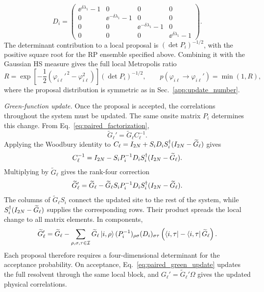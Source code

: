 \begin{equation}
    D_i=
    \begin{pmatrix}
        \ee^{\delta\lambda_1}-1&0&0&0\\
        0&\ee^{-\delta\lambda_1}-1&0&0\\
        0&0&\ee^{-\delta\lambda_1}-1&0\\
        0&0&0&\ee^{\delta\lambda_1}-1
    \end{pmatrix}.
\end{equation}
The determinant contribution to a local proposal is $(\det P_i)^{-1/2}$, with the positive square root for the RP ensemble specified above. Combining it with the Gaussian HS measure gives the full local Metropolis ratio
\begin{equation}
    R=
    \exp\left[-\frac12(\varphi_{i\ell}'^{\,2}-\varphi_{i\ell}^{2})\right]
    (\det P_i)^{-1/2},
    \qquad
    p(\varphi_{i\ell}\to \varphi_{i\ell}')=\min(1,R),
    \label{eq:paired_metropolis_ratio}
\end{equation}
where the proposal distribution is symmetric as in Sec.~\ref{app:update_number}.

\emph{Green-function update.} Once the proposal is accepted, the correlations throughout the system must be updated. The same onsite matrix $P_i$ determines this change. From Eq.~\eqref{eq:paired_factorization},
\begin{equation}
    \widetilde G_\ell'
    =
    \widetilde G_\ell C_\ell^{-1}.
\end{equation}
Applying the Woodbury identity to $C_\ell=I_{2N}+S_iD_i S_i^\dagger(I_{2N}-\widetilde G_\ell)$ gives
\begin{equation}
    C_\ell^{-1}
    =
    I_{2N}
    -
    S_i P_i^{-1}D_i S_i^\dagger(I_{2N}-\widetilde G_\ell).
    \label{eq:paired_woodbury}
\end{equation}
Multiplying by $\widetilde G_\ell$ gives the rank-four correction
\begin{equation}
    \widetilde G_\ell'
    =\widetilde G_\ell
    -\widetilde G_\ell S_i P_i^{-1}D_i S_i^\dagger(I_{2N}-\widetilde G_\ell).
\end{equation}
The columns of $\widetilde G_\ell S_i$ connect the updated site to the rest of the system, while $S_i^\dagger(I_{2N}-\widetilde G_\ell)$ supplies the corresponding rows. Their product spreads the local change to all matrix elements. In components,
\begin{equation}
    \widetilde G_\ell'
    =
    \widetilde G_\ell
    -
    \sum_{\rho,\sigma,\tau\in\mathcal I}
    \widetilde G_\ell\ket{i,\rho}
    (P_i^{-1})_{\rho\sigma}(D_i)_{\sigma\tau}
    \left(\bra{i,\tau}-\bra{i,\tau}\widetilde G_\ell\right).
    \label{eq:paired_green_update}
\end{equation}
Each proposal therefore requires a four-dimensional determinant for the acceptance probability. On acceptance, Eq.~\eqref{eq:paired_green_update} updates the full resolvent through the same local block, and $G_\ell'=\widetilde G_\ell'\Omega$ gives the updated physical correlations.

